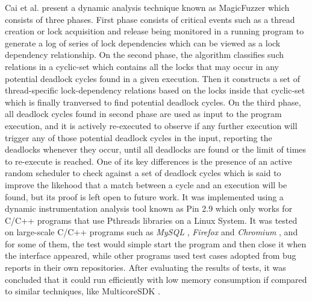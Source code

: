 Cai et al. \cite{magicfuzzer} present a dynamic analysis technique known as MagicFuzzer which consists of three phases.
First phase consists of critical events such as a thread creation or lock acquisition and release being monitored in a running program to generate
a log of series of lock dependencies which can be viewed as a lock dependency relationship.
On the second phase, the algorithm classifies such relations in a cyclic-set which contains all the locks that may occur in any
potential deadlock cycles found in a given execution.
Then it constructs a set of thread-specific lock-dependency relations based on the locks inside that cyclic-set which is finally tranversed to find potential deadlock cycles.
On the third phase, all deadlock cycles found in second phase are used as input to the program execution,
and it is actively re-executed to observe if any further execution will trigger any of those
potential deadlock cycles in the input, reporting the deadlocks whenever they occur, until all deadlocks are found or the limit of times to re-execute is reached.
One of its key differences is the presence of an active random scheduler to check against a set of deadlock cycles
which is said to improve the likehood that a match between a cycle and an execution will be found, but its proof is left open to future work.
It was implemented using a dynamic instrumentation analysis tool known as Pin 2.9 \cite{pin} which only works for C/C++ programs that use Pthreads libraries on a Linux System.
It was tested on large-scale C/C++ programs such as \emph{MySQL} \cite{mysql}, \emph{Firefox} \cite{firefox} and \emph{Chromium} \cite{chromium},
and for some of them, the test would simple start the program and then close it when the interface appeared, while other programs used test cases adopted
from bug reports in their own repositories. After evaluating the results of tests, it was concluded that it could run efficiently with low memory consumption
if compared to similar techniques, like MulticoreSDK \cite{mcsdk}.

